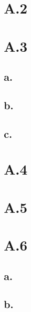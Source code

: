 \documentclass{article}
\newcommand{\1}{\mathbf{1}}
\begin{document}
\section*{A.2}
{\Large 



}

\section*{A.3}
{\Large 

\subsection*{a.}

\subsection*{b.}

\subsection*{c.}

}

\section*{A.4}
{\Large 



}

\section*{A.5}
{\Large 



}

\section*{A.6}
{\Large 

\subsection*{a.}

\subsection*{b.}

}
\end{document}
